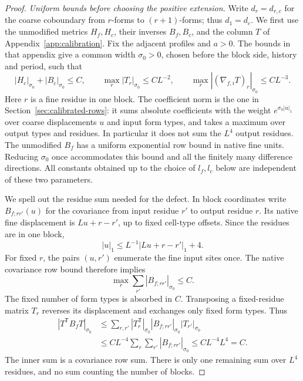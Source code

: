 \documentclass[11pt,reqno]{amsart}
\numberwithin{equation}{section}
\theoremstyle{definition}
\theoremstyle{remark}
\begin{document}
\begin{proof}
\emph{Uniform bounds before choosing the positive extension.}
Write \(d_r=d_{r,c}\) for the coarse coboundary from
\(r\)-forms to \((r+1)\)-forms; thus \(d_1=d_c\).
We first use the unmodified metrics \(H_f,H_c\), their
inverses \(B_f,B_c\), and the column \(T\) of
Appendix~\ref{app:calibration}. Fix the adjacent profiles and
\(a>0\). The bounds in that appendix give a common width
\(\sigma_0>0\), chosen before the block side, history and
period, such that
\begin{equation}
 |H_c|_{\sigma_0}+|B_c|_{\sigma_0}\le C,\qquad
 \max_r|T_r|_{\sigma_0}\le CL^{-2},\qquad
 \max_r|(\nabla_{f,i}T)_r|_{\sigma_0}\le CL^{-3}.
 \label{eq:packet-complement-input-bounds}
\end{equation}
Here \(r\) is a fine residue in one block. The coefficient
norm is the one in Section~\ref{sec:calibrated-rows}: it sums
absolute coefficients with the weight
\(e^{\sigma_0|u|_1}\) over coarse displacements \(u\) and
input form types, and takes a maximum over output types and
residues. In particular it does not sum the \(L^4\) output
residues. The unmodified \(B_f\) has a uniform exponential
row bound in native fine units. Reducing \(\sigma_0\) once
accommodates this bound and all the finitely many difference
directions. All constants obtained up to the choice of
\(l_f,l_c\) below are independent of these two parameters.

We spell out the residue sum needed for the defect. In block
coordinates write \(B_{f;rr'}(u)\) for the covariance from
input residue \(r'\) to output residue \(r\). Its native fine
displacement is \(Lu+r-r'\), up to fixed cell-type offsets.
Since the residues are in one block,
\[
 |u|_1\le L^{-1}|Lu+r-r'|_1+4.
\]
For fixed \(r\), the pairs \((u,r')\) enumerate the fine input
sites once. The native covariance row bound therefore implies
\[
                 \max_r\sum_{r'}|B_{f;rr'}|_{\sigma_0}\le C.
\]
The fixed number of form types is absorbed in \(C\).
Transposing a fixed-residue matrix \(T_r\) reverses its
displacement and exchanges only fixed form types. Thus
\begin{equation}
 \begin{split}
 |T^{\mathsf T}B_fT|_{\sigma_0}
 &\le\sum_{r,r'}|T_r^{\mathsf T}|_{\sigma_0}
                   |B_{f;rr'}|_{\sigma_0}|T_{r'}|_{\sigma_0}\\
 &\le CL^{-4}\sum_r\sum_{r'}|B_{f;rr'}|_{\sigma_0}
 \le CL^{-4}L^4=C.
 \end{split}
 \label{eq:packet-defect-residue-sum}
\end{equation}
The inner sum is a covariance row sum. There is only one
remaining sum over \(L^4\) residues, and no sum counting the
number of blocks.


\end{proof}
\end{document}
